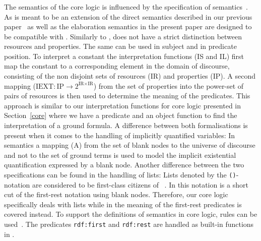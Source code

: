 \subsubsection{\rdf }
The semantics of the core logic is influenced by the specification of
\rdf semantics~\cite{RDFSemantics}. As \notationthree is meant to be an extension of \rdf the direct semantics described in our previous paper~\cite{arndt_ruleml_2015} as well as 
the elaboration semantics in the present paper are designed to be compatible with \rdf. 
Similarly to \nthree, \rdf does not have a strict distinction between resources and properties. The same \uri can be used in subject and in predicate position.
To interpret a constant the interpretation functions (IS and IL) first map the constant to a corresponding element in the domain of discourse,
consisting of the non disjoint sets of resources (IR) and properties (IP).
A second mapping ($\text{IEXT}:\text{IP}\rightarrow 2^{\text{IR}\times\text{IR}}$) from the set of properties into the power-set of pairs of resources is then used to determine the meaning of the predicates. 
This approach is similar to our interpretation functions for core logic
presented in Section~\ref{core} where we have a predicate and an object function to find the interpretation of a ground formula.
A difference between both formalisations is present when it comes to the handling of implicitly quantified variables: 
In \rdf semantics a mapping (A) from the set of blank nodes to the universe of discourse and not to the set of ground terms is used 
to model the implicit existential quantification expressed by a blank node.
Another difference
between the two specifications can be found in the handling of lists: Lists denoted by the \texttt{()}-notation 
are considered to be first-class citizens of \nthree~\cite{Notation3}. In \rdf this notation 
is a short cut of the first-rest notation 
using blank nodes. Therefore, our core logic specifically deals with lists while in \rdf the meaning of the first-rest predicates is covered instead. 
To support the definitions of \rdf semantics in core logic, rules can be used~\cite[p.6f]{N3Logic}. The predicates \texttt{rdf:first} and \texttt{rdf:rest} are handled as built-in functions in \nthree. 

